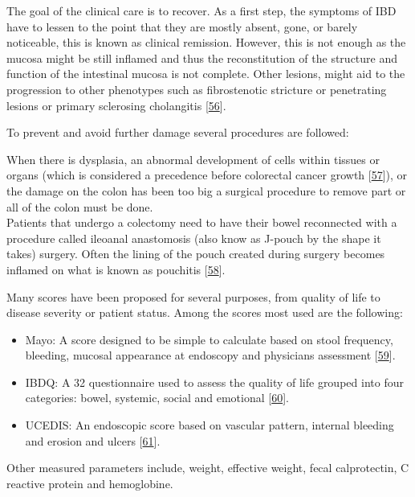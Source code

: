 \documentclass[
  12pt,
  a4paper,
  twoside,
  openright]{book}
\begin{document}
The goal of the clinical care is to recover.
As a first step, the symptoms of IBD have to lessen to the point that they are mostly absent, gone, or barely noticeable, this is known as clinical remission.
However, this is not enough as the mucosa might be still inflamed and thus the reconstitution of the structure and function of the intestinal mucosa is not complete.
Other lesions, might aid to the progression to other phenotypes such as fibrostenotic stricture or penetrating lesions or primary sclerosing cholangitis {[}\protect\hyperlink{ref-boonstra2012}{56}{]}.

To prevent and avoid further damage several procedures are followed:

When there is dysplasia, an abnormal development of cells within tissues or organs (which is considered a precedence before colorectal cancer growth {[}\protect\hyperlink{ref-mark-christensen2018}{57}{]}), or the damage on the colon has been too big a surgical procedure to remove part or all of the colon must be done.\\
Patients that undergo a colectomy need to have their bowel reconnected with a procedure called ileoanal anastomosis (also know as J-pouch by the shape it takes) surgery.
Often the lining of the pouch created during surgery becomes inflamed on what is known as pouchitis {[}\protect\hyperlink{ref-schieffer2016}{58}{]}.

Many scores have been proposed for several purposes, from quality of life to disease severity or patient status.
Among the scores most used are the following:

\begin{itemize}
\item
  Mayo: A score designed to be simple to calculate based on stool frequency, bleeding, mucosal appearance at endoscopy and physicians assessment {[}\protect\hyperlink{ref-schroeder1987}{59}{]}.
\item
  IBDQ: A 32 questionnaire used to assess the quality of life grouped into four categories: bowel, systemic, social and emotional {[}\protect\hyperlink{ref-irvine1999}{60}{]}.
\item
  UCEDIS: An endoscopic score based on vascular pattern, internal bleeding and erosion and ulcers {[}\protect\hyperlink{ref-travis2012}{61}{]}.
\end{itemize}

Other measured parameters include, weight, effective weight, fecal calprotectin, C reactive protein and hemoglobine.
\end{document}
